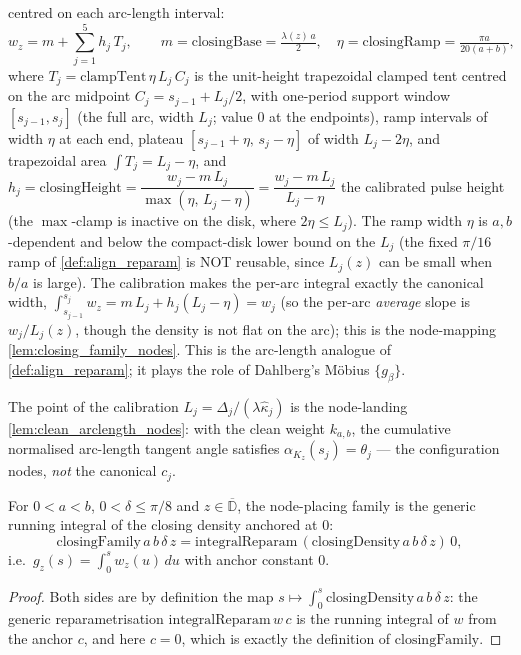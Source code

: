 \begin{definition}
  centred on each arc-length interval:
  \[
    w_z=m+\sum_{j=1}^5 h_j\,T_j,\qquad m=\mathrm{closingBase}=\tfrac{\lambda(z)\,a}{2},
    \quad \eta=\mathrm{closingRamp}=\tfrac{\pi a}{20(a+b)},
  \]
  where $T_j=\mathrm{clampTent}\,\eta\,L_j\,C_j$ is the unit-height trapezoidal
  clamped tent centred on the arc midpoint $C_j=s_{j-1}+L_j/2$, with one-period
  support window $[s_{j-1},s_j]$ (the full arc, width $L_j$; value $0$ at the
  endpoints), ramp intervals of width $\eta$ at each end, plateau
  $[s_{j-1}+\eta,\,s_j-\eta]$ of width $L_j-2\eta$, and trapezoidal area
  $\int T_j=L_j-\eta$, and
  $h_j=\mathrm{closingHeight}=\dfrac{w_j-m\,L_j}{\max(\eta,\,L_j-\eta)}
       =\dfrac{w_j-m\,L_j}{L_j-\eta}$
  the calibrated pulse height (the $\max$-clamp is inactive on the disk, where
  $2\eta\le L_j$). The ramp width $\eta$ is $a,b$-dependent and below the
  compact-disk lower bound on the $L_j$ (the fixed $\pi/16$ ramp of
  \cref{def:align_reparam} is NOT reusable, since $L_j(z)$ can be small when $b/a$
  is large). The calibration makes the per-arc integral exactly the canonical
  width, $\int_{s_{j-1}}^{s_j}w_z=m\,L_j+h_j(L_j-\eta)=w_j$ (so the per-arc
  \emph{average} slope is $w_j/L_j(z)$, though the density is not flat on the arc);
  this is the node-mapping \cref{lem:closing_family_nodes}. This is the arc-length
  analogue of \cref{def:align_reparam}; it plays the role of Dahlberg's Möbius
  $\{g_\beta\}$.

  The point of the calibration $L_j=\Delta_j/(\lambda\hat\kappa_j)$ is the
  node-landing \cref{lem:clean_arclength_nodes}: with the clean weight $k_{a,b}$,
  the cumulative normalised arc-length tangent angle satisfies
  $\alpha_{K_z}(s_j)=\theta_j$ --- the configuration nodes, \emph{not} the canonical
  $c_j$.
\end{definition}

\begin{lemma}

  \label{lem:closing_family_eq}
  For $0<a<b$, $0<\delta\le\pi/8$ and $z\in\overline{\mathbb{D}}$, the node-placing
  family is the generic running integral of the closing density anchored at $0$:
  \[
    \mathrm{closingFamily}\,a\,b\,\delta\,z
      =\mathrm{integralReparam}\,(\mathrm{closingDensity}\,a\,b\,\delta\,z)\,0 ,
  \]
  i.e.\ $g_z(s)=\int_0^s w_z(u)\,du$ with anchor constant $0$.
\end{lemma}
\begin{proof}
  \leanok
  Both sides are by definition the map
  $s\mapsto\int_0^s\mathrm{closingDensity}\,a\,b\,\delta\,z$: the generic
  reparametrisation $\mathrm{integralReparam}\,w\,c$ is the running integral of $w$
  from the anchor $c$, and here $c=0$, which is exactly the definition of
  $\mathrm{closingFamily}$.
\end{proof}

